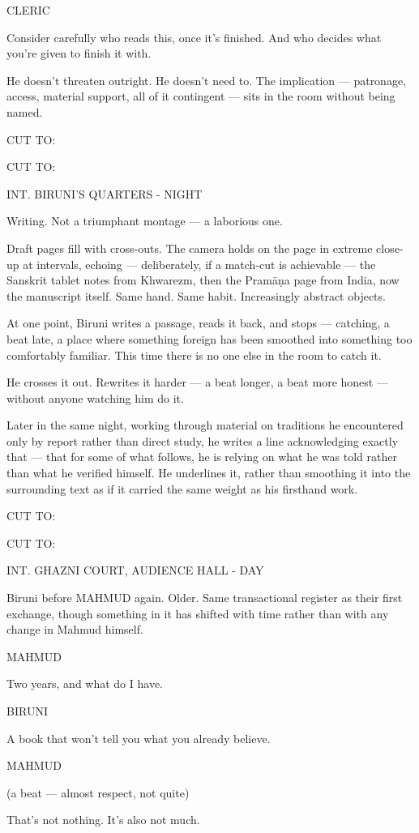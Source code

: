 \documentclass[12pt]{article}
\newcommand{\sceneheading}[1]{%
  \needspace{4\baselineskip}%
  \par\vspace{1\baselineskip}\noindent #1\par\vspace{0.6\baselineskip}%
}
\newcommand{\action}[1]{%
  \par\noindent #1\par\vspace{0.6\baselineskip}%
}
\newcommand{\transition}[1]{%
  \par\vspace{0.3\baselineskip}%
  \ifthenelse{\equal{#1}{FADE IN:}}%
    {\noindent #1\par}%
    {\noindent\hfill #1\par}%
  \vspace{0.6\baselineskip}%
}
\newcommand{\charcue}[1]{%
  \needspace{3\baselineskip}%
  \par\vspace{0.3\baselineskip}\noindent\hspace*{2.2in}#1\par%
}
\newenvironment{dialogue}{%
  \begin{list}{}{%
    \setlength{\leftmargin}{1.1in}%
    \setlength{\rightmargin}{1.6in}%
    \setlength{\listparindent}{0pt}%
    \setlength{\itemindent}{0pt}%
    \setlength{\parsep}{0pt}%
    \setlength{\itemsep}{0pt}%
    \setlength{\topsep}{0pt}%
  }\item[]%
}{%
  \end{list}\vspace{0.4\baselineskip}%
}
\newcommand{\parenthetical}[1]{%
  \hspace*{-0.4in}\hspace*{1.1in}(#1)\par%
}
\begin{document}
\charcue{CLERIC}
\begin{dialogue}
Consider carefully who reads this, once it's finished. And who decides what you're given to finish it with.\\
\end{dialogue}
\action{He doesn't threaten outright. He doesn't need to. The implication --- patronage, access, material support, all of it contingent --- sits in the room without being named.}
\transition{CUT TO:}
\sceneheading{INT. BIRUNI'S QUARTERS - NIGHT}
\action{Writing. Not a triumphant montage --- a laborious one.}
\action{Draft pages fill with cross-outs. The camera holds on the page in extreme close-up at intervals, echoing --- deliberately, if a match-cut is achievable --- the Sanskrit tablet notes from Khwarezm, then the Pramāṇa page from India, now the manuscript itself. Same hand. Same habit. Increasingly abstract objects.}
\action{At one point, Biruni writes a passage, reads it back, and stops --- catching, a beat late, a place where something foreign has been smoothed into something too comfortably familiar. This time there is no one else in the room to catch it.}
\action{He crosses it out. Rewrites it harder --- a beat longer, a beat more honest --- without anyone watching him do it.}
\action{Later in the same night, working through material on traditions he encountered only by report rather than direct study, he writes a line acknowledging exactly that --- that for some of what follows, he is relying on what he was told rather than what he verified himself. He underlines it, rather than smoothing it into the surrounding text as if it carried the same weight as his firsthand work.}
\transition{CUT TO:}
\sceneheading{INT. GHAZNI COURT, AUDIENCE HALL - DAY}
\action{Biruni before MAHMUD again. Older. Same transactional register as their first exchange, though something in it has shifted with time rather than with any change in Mahmud himself.}
\charcue{MAHMUD}
\begin{dialogue}
Two years, and what do I have.\\
\end{dialogue}
\charcue{BIRUNI}
\begin{dialogue}
A book that won't tell you what you already believe.\\
\end{dialogue}
\charcue{MAHMUD}
\begin{dialogue}
\parenthetical{a beat --- almost respect, not quite}
That's not nothing. It's also not much.\\
\end{dialogue}
\end{document}

